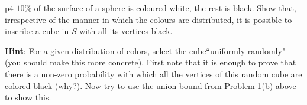 \documentclass[a4paper, 11pt]{article}
\begin{document}

\begin{problem}{%
	}{p4%
	}
 $10 \%$ of the surface of a sphere is coloured white, the rest is black. Show that, irrespective of the manner in which the colours are distributed, it is possible to inscribe a cube in $S$ with all its vertices black.

\textbf{Hint}: For a given distribution of colors, select the cube``uniformly randomly" (you should make this more concrete). First note that it is enough to prove that there is a non-zero probability with which all the vertices of this random cube are colored black (why?). Now try to use the union bound from Problem 1(b) above to show this.
\end{problem}
\end{document}
